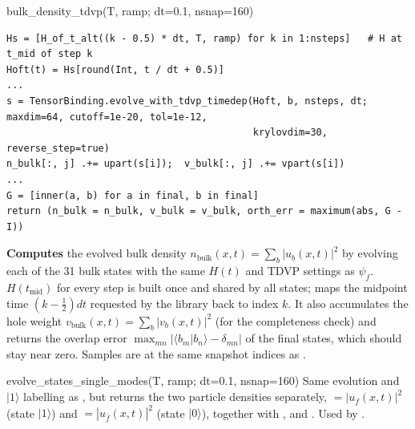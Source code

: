 \documentclass[11pt]{article}
\newcommand{\ket}[1]{\lvert #1\rangle}
\begin{document}
\begin{function}{bulk\_density\_tdvp(T, ramp; dt=0.1, nsnap=160)}
\begin{Verbatim}
Hs = [H_of_t_alt((k - 0.5) * dt, T, ramp) for k in 1:nsteps]   # H at t_mid of step k
Hoft(t) = Hs[round(Int, t / dt + 0.5)]
...
s = TensorBinding.evolve_with_tdvp_timedep(Hoft, b, nsteps, dt; maxdim=64, cutoff=1e-20, tol=1e-12,
                                           krylovdim=30, reverse_step=true)
n_bulk[:, j] .+= upart(s[i]);  v_bulk[:, j] .+= vpart(s[i])
...
G = [inner(a, b) for a in final, b in final]
return (n_bulk = n_bulk, v_bulk = v_bulk, orth_err = maximum(abs, G - I))
\end{Verbatim}
\textbf{Computes} the evolved bulk density $n_{\text{bulk}}(x,t)=\sum_b|u_b(x,t)|^2$ by evolving each of the 31 bulk
states with the same $H(t)$ and TDVP settings as $\psi_f$. $H(t_{\text{mid}})$ for every step is built once and shared
by all states;  maps the midpoint time $(k-\frac12)dt$ requested by the library back to index $k$. It also
accumulates the hole weight $v_{\text{bulk}}(x,t)=\sum_b|v_b(x,t)|^2$ (for the completeness check) and returns the
overlap error $\max_{mn}|\langle b_m\vert b_n\rangle-\delta_{mn}|$ of the final states, which should stay near zero.
Samples are at the same snapshot indices as .
\end{function}

\begin{function}{evolve\_states\_single\_modes(T, ramp; dt=0.1, nsnap=160)}
Same evolution and $\ket{1}$ labelling as , but returns the two particle densities separately,
 $=|u_f(x,t)|^2$ (state $\ket{1}$) and  $=|u_{\bar f}(x,t)|^2$ (state $\ket{0}$), together
with ,  and . Used by .
\end{function}
\end{document}
